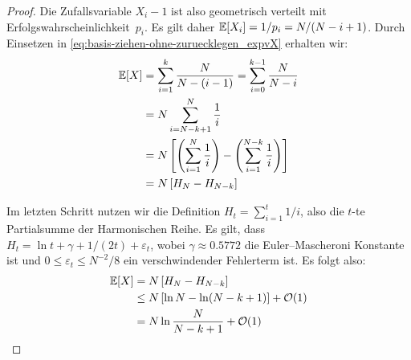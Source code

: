 \begin{proof}
    Die Zufallsvariable $X_i - 1$ ist also geometrisch verteilt mit Erfolgswahrscheinlichkeit~$p_i$.
    Es gilt daher $\mathbb{E}\!\left[X_i\right] = 1 / p_i = N / (N - i + 1)$. Durch Einsetzen in \cref{eq:basis-ziehen-ohne-zuruecklegen_expvX} erhalten wir:
    \begin{align}
        \mathbb{E}\!\left[X\right] & = \sum_{i=1}^k \frac{N}{N-(i-1)} = \sum_{i=0}^{k-1} \frac{N}{N - i}                                      \\
                 & = N \sum_{i=N-k+1}^N \frac{1}{i}                                                                         \\
                 & = N \left[ \left( \sum_{i=1}^N \frac{1}{i} \right) - \left( \sum_{i=1}^{N-k} \frac{1}{i} \right) \right] \\
                 & = N \left[ H_N - H_{N-k} \right]
    \end{align}

    Im letzten Schritt nutzen wir die Definition $H_t = \sum_{i=1}^t 1/i$, also die $t$-te Partialsumme der Harmonischen Reihe.
    Es gilt, dass $H_t = \ln t + \gamma + 1/(2t) + \varepsilon_t$, wobei $\gamma \approx 0.5772$ die Euler–Mascheroni Konstante ist und $0 \le \varepsilon_t \le N^{-2}/8$ ein verschwindender Fehlerterm ist.
    Es folgt also:
    \begin{align}
        \mathbb{E}\!\left[X\right] & = N \left[ H_N - H_{N-k} \right]                      \\
                 & \le N \left[ \ln N - \ln (N - k + 1) \right] + \mathcal{O}\!\left(1\right) \\
                 & = N \ln \frac{N}{N - k + 1} + \mathcal{O}\!\left(1\right)
    \end{align}
\end{proof}

